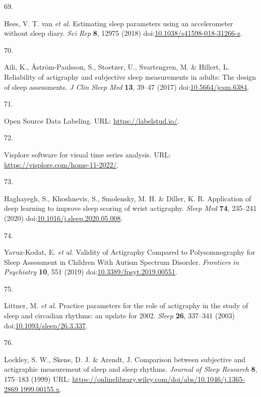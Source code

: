 \documentclass[
  9pt,
]{scrbook}
\newlength{\cslhangindent}
\newlength{\csllabelwidth}
\newlength{\cslentryspacingunit} %
\newenvironment{CSLReferences}[2] %
 {%
  \setlength{\parindent}{0pt}
  \ifodd #1
  \let\oldpar\par
  \def\par{\hangindent=\cslhangindent\oldpar}
  \fi
  \setlength{\parskip}{#2\cslentryspacingunit}
 }%
 {}
\newcommand{\CSLLeftMargin}[1]{\parbox[t]{\csllabelwidth}{#1}}
\newcommand{\CSLRightInline}[1]{\parbox[t]{\linewidth - \csllabelwidth}{#1}\break}
\begin{document}
\begin{CSLReferences}{0}{0}
\leavevmode{}%
\CSLLeftMargin{69. }%
\CSLRightInline{Hees, V. T. van \emph{et al.} Estimating sleep
parameters using an accelerometer without sleep diary. \emph{Sci Rep}
\textbf{8}, 12975 (2018)
doi:\href{https://doi.org/10.1038/s41598-018-31266-z}{10.1038/s41598-018-31266-z}.}

\leavevmode{}%
\CSLLeftMargin{70. }%
\CSLRightInline{Aili, K., Åström-Paulsson, S., Stoetzer, U.,
Svartengren, M. \& Hillert, L. Reliability of actigraphy and subjective
sleep measurements in adults: The design of sleep assessments. \emph{J
Clin Sleep Med} \textbf{13}, 39--47 (2017)
doi:\href{https://doi.org/10.5664/jcsm.6384}{10.5664/jcsm.6384}.}

\leavevmode{}%
\CSLLeftMargin{71. }%
\CSLRightInline{Open Source Data Labeling. URL:
\url{https://labelstud.io/}.}

\leavevmode{}%
\CSLLeftMargin{72. }%
\CSLRightInline{Visplore {\textendash} software for visual time series
analysis. URL: \url{https://visplore.com/home-11-2022/}.}

\leavevmode{}%
\CSLLeftMargin{73. }%
\CSLRightInline{Haghayegh, S., Khoshnevis, S., Smolensky, M. H. \&
Diller, K. R. Application of deep learning to improve sleep scoring of
wrist actigraphy. \emph{Sleep Med} \textbf{74}, 235--241 (2020)
doi:\href{https://doi.org/10.1016/j.sleep.2020.05.008}{10.1016/j.sleep.2020.05.008}.}

\leavevmode{}%
\CSLLeftMargin{74. }%
\CSLRightInline{Yavuz-Kodat, E. \emph{et al.} Validity of Actigraphy
Compared to Polysomnography for Sleep Assessment in Children With Autism
Spectrum Disorder. \emph{Frontiers in Psychiatry} \textbf{10}, 551
(2019)
doi:\href{https://doi.org/10.3389/fpsyt.2019.00551}{10.3389/fpsyt.2019.00551}.}

\leavevmode{}%
\CSLLeftMargin{75. }%
\CSLRightInline{Littner, M. \emph{et al.} Practice parameters for the
role of actigraphy in the study of sleep and circadian rhythms: an
update for 2002. \emph{Sleep} \textbf{26}, 337--341 (2003)
doi:\href{https://doi.org/10.1093/sleep/26.3.337}{10.1093/sleep/26.3.337}.}

\leavevmode{}%
\CSLLeftMargin{76. }%
\CSLRightInline{Lockley, S. W., Skene, D. J. \& Arendt, J. Comparison
between subjective and actigraphic measurement of sleep and sleep
rhythms. \emph{Journal of Sleep Research} \textbf{8}, 175--183 (1999)
URL:
\url{https://onlinelibrary.wiley.com/doi/abs/10.1046/j.1365-2869.1999.00155.x}.}


\end{CSLReferences}
\end{document}
